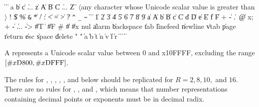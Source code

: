 \begin{grammar}%
 \:  
 \>  \| 
 \:  \| 
 \> \| 
 \:  a \| b \| c \| ... \| z
\> \| A \| B \| C \| ... \| Z
 \: 
 \> \| $\langle${\rm any character whose Unicode scalar value is greater than}
 \> 
 \> $\rangle$
 \: ! \| \$ \| \% \| \verb"&" \| * \| / \| : \| < \| =
 \>  \| > \| ? \| \verb"^" \| \verb"_" \| \verb"~"
 \:  \| 
 \>  \| 
 \>  \| 
  \| 1 \| 2 \| 3 \| 4 \| 5 \| 6 \| 7 \| 8 \| 9
 \: 
 \> \| a \| A \| b \| B \| c \| C \| d \| D \| e \| E \| f \| F
 \: + \| - \| .\ \| @
 \: \backwhack{}x;
 \: 
 \: + \| - \| ... \| -> 
 \: \schtrue{} \| \#T \| \schfalse{} \| \#F
 \: \#\backwhack{}
 \>  \| \#\backwhack{}
 \>  \| \#\backwhack{}x
 \: nul \| alarm \| backspace \| tab
\> \| linefeed \| newline \| vtab \| page \| return
\> \| esc \| space \| delete
 \: "  "
 \: 
 \> \| \backwhack{}a \| \backwhack{}b \| \backwhack{}t \| \backwhack{}n \| \backwhack{}v \| \backwhack{}f \| \backwhack{}r
 \>  \| \backwhack\doublequote{} \| \backwhack\backwhack 
 \>  \| \backwhack{} \| \backwhack{}
 \>  \| %
\end{grammar}

A  represents a Unicode scalar value
between 0 and \sharpsign{}x10FFFF, excluding the range
$\left[{\tt\#}{}x\textrm{D800}, {\tt\#}{}x\textrm{DFFF}\right]$.

\label{numbersyntax}%
The rules for , , , , , and  below
should be replicated for \hbox{$R = 2, 8, 10,$}
and $16$.  There are no rules for , , and , which means that number representations containing
decimal points or exponents must be in decimal radix.

